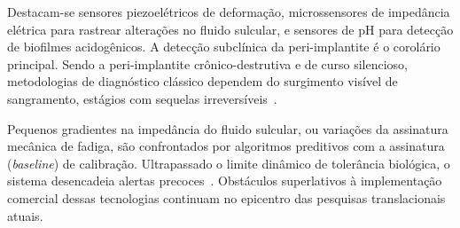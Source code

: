 Destacam-se sensores piezoelétricos de deformação, microssensores de impedância elétrica para rastrear alterações no fluido sulcular, e sensores de pH para detecção de biofilmes acidogênicos. A detecção subclínica da peri-implantite é o corolário principal. Sendo a peri-implantite crônico-destrutiva e de curso silencioso, metodologias de diagnóstico clássico dependem do surgimento visível de sangramento, estágios com sequelas irreversíveis~\cite{elsaid2025digital}. 

 Pequenos gradientes na impedância do fluido sulcular, ou variações da assinatura mecânica de fadiga, são confrontados por algoritmos preditivos com a assinatura (\textit{baseline}) de calibração. Ultrapassado o limite dinâmico de tolerância biológica, o sistema desencadeia alertas precoces~\cite{khoshfekr2025digital}. Obstáculos superlativos à implementação comercial dessas tecnologias continuam no epicentro das pesquisas translacionais atuais.
